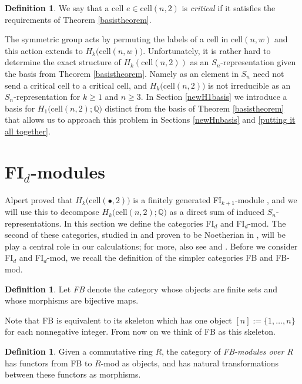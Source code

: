 \documentclass[12py]{amsart}%
\theoremstyle{definition}\newtheorem{definition}[thm]{Definition}
\theoremstyle{definition}
\newtheorem{defn}[thm]{Definition}
\newcommand{\Q}{\ensuremath{\mathbb{Q}}}
\begin{document}
\begin{defn}
We say that a cell $e\in \text{cell}(n,2)$ is \emph{critical} if it satisfies the requirements of Theorem \ref{basistheorem}.
\end{defn}

The symmetric group acts by permuting the labels of a cell in $\text{cell}(n,w)$ and this action extends to $H_{k}\big(\text{cell}(n,w)\big)$. Unfortunately, it is rather hard to determine the exact structure of $H_{k}(\text{cell}(n,2))$ as an $S_{n}$-representation given the basis from Theorem \ref{basistheorem}. Namely as an element in $S_{n}$ need not send a critical cell to a critical cell, and $H_{k}\big(\text{cell}(n,2)\big)$ is not irreducible as an $S_{n}$-representation for $k\ge 1$ and $n\ge 3$. In Section \ref{newH1basis} we introduce a basis for $H_{1}\big(\text{cell}(n,2);\Q\big)$ distinct from the basis of Theorem \ref{basistheorem} that allows us to approach this problem in Sections \ref{newHnbasis} and \ref{putting it all together}.

\section{FI$_{d}$-modules}

Alpert proved that $H_{k}\big(\text{cell}(\bullet,2)\big)$ is a finitely generated FI$_{k+1}$-module \cite[Theorem 6.1]{alpert2020generalized}, and we will use this to decompose $H_{k}\big(\text{cell}(n,2);\Q\big)$ as a direct sum of induced $S_{n}$-representations. In this section we define the categories FI$_{d}$ and FI$_{d}$-mod. The second of these categories, studied in \cite{ramos2017generalized} and proven to be Noetherian in \cite{sam2017grobner}, will be play a central role in our calculations; for more, also see \cite{ramos2019configuration} and \cite{sam_snowden_2019}. Before we consider FI$_{d}$ and FI$_{d}$-mod, we recall the definition of the simpler categories FB and FB-mod.

\begin{defn}
Let \emph{FB} denote the category whose objects are finite sets and whose morphisms are bijective maps.
\end{defn}

Note that FB is equivalent to its skeleton which has one object $[n]:=\{1,\dots, n\}$ for each nonnegative integer. From now on we think of FB as this skeleton.

\begin{defn}
Given a commutative ring $R$, the category of \emph{FB-modules over $R$} has functors from FB to $R$-mod as objects, and has natural transformations between these functors as morphisms.
\end{defn}
\end{document}
